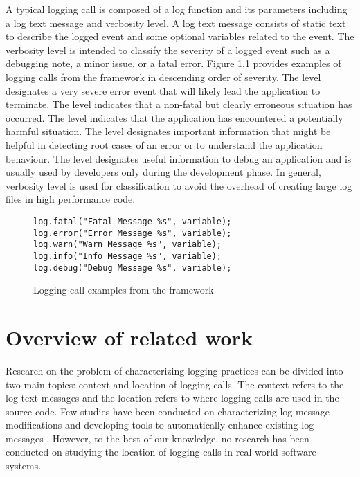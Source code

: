 A typical logging call is composed of a log function and its parameters including a log text message and verbosity level. A log text message consists of static text to describe the logged event and some optional variables related to the event. The verbosity level is intended to classify the severity of a logged event such as a debugging note, a minor issue, or a fatal error. Figure 1.1 provides examples of logging calls from the  framework in descending order of severity. The  level designates a very severe error event that will likely lead the application to terminate. The  level indicates that a non-fatal but clearly erroneous situation has occurred. The  level indicates that the application has encountered a potentially harmful situation. The  level designates important information that might be helpful in detecting root cases of an error or to understand the application behaviour. The  level designates useful information to debug an application and is usually used by developers only during the development phase. In general, verbosity level is used for classification to avoid the overhead of creating large log files in high performance code.


\begin{figure}[H]
\begin{center}
\begin{minipage}{4in}
\begin{lstlisting}[frame=single,numbers=none]
log.fatal("Fatal Message %s", variable);
log.error("Error Message %s", variable);
log.warn("Warn Message %s", variable);
log.info("Info Message %s", variable);
log.debug("Debug Message %s", variable);
\end{lstlisting}
\end{minipage}
\caption{Logging call examples from the  framework\label{fig:chap1_logCode}}
\end{center}
\end{figure}


\section{Overview of related work} \label{intro-rw}

Research on the problem of characterizing logging practices can be divided into two main topics: context and location of logging calls. The context refers to the log text messages and the location refers to where logging calls are used in the source code. 
Few studies have been conducted on characterizing log message modifications \cite{yuan2012characterizing} and developing tools to automatically enhance existing log messages \cite{yuan2012improving, yuan2010sherlog}. However, to the best of our knowledge, no research has been conducted on studying the location of logging calls in real-world software systems.


